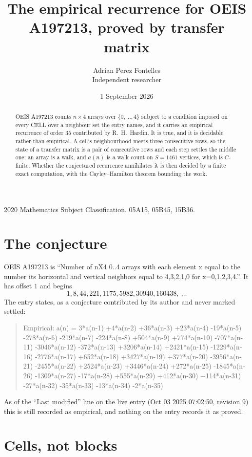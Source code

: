 \documentclass[11pt,a4paper]{article}
\title{The empirical recurrence for OEIS A197213, proved by transfer matrix}
\author{Adrian Perez Fontelles\\ \small Independent researcher}
\date{1 September 2026}
\theoremstyle{plain}
\theoremstyle{definition}
\begin{document}
\maketitle

\begin{abstract}
OEIS A197213 counts $n\times4$ arrays over $\{0,\dots,4\}$ subject to a condition imposed on
every CELL over a neighbour set the entry names, and it carries an empirical recurrence of
order $35$ contributed by R.~H.~Hardin. It is true, and it is decidable rather than
empirical. A cell's neighbourhood meets three consecutive rows, so the state of a transfer
matrix is a pair of consecutive rows and each step settles the middle one; an array is a
walk, and $a(n)$ is a walk count on $S=1461$ vertices, which is $C$-finite. Whether the
conjectured recurrence annihilates it is then decided by a finite exact computation, with the
Cayley--Hamilton theorem bounding the work.
\end{abstract}

\noindent\small 2020 Mathematics Subject Classification. 05A15, 05B45, 15B36.\normalsize

\section{The conjecture}

OEIS A197213 is ``Number of nX4 0..4 arrays with each element x equal to the number its horizontal and vertical neighbors equal to 4,3,2,1,0 for x=0,1,2,3,4.''. It has offset $1$ and begins
\[
1, 8, 44, 221, 1175, 5982, 30940, 160438,\ \dots
\]
The entry states, as a conjecture contributed by its author and never marked settled:
\begin{quote}
Empirical: a(n) = 3*a(n-1) +4*a(n-2) +36*a(n-3) +23*a(n-4) -19*a(n-5) -278*a(n-6) -219*a(n-7) -224*a(n-8) +504*a(n-9) +774*a(n-10) -707*a(n-11) -3046*a(n-12) -372*a(n-13) +3206*a(n-14) +2421*a(n-15) -1229*a(n-16) -2776*a(n-17) +652*a(n-18) +3427*a(n-19) +377*a(n-20) -3956*a(n-21) -2455*a(n-22) +2524*a(n-23) +3446*a(n-24) +272*a(n-25) -1845*a(n-26) -1309*a(n-27) -17*a(n-28) +555*a(n-29) +412*a(n-30) +114*a(n-31) -27*a(n-32) -35*a(n-33) -13*a(n-34) -2*a(n-35)
\end{quote}
As of the ``Last modified'' line on the live entry (Oct 03 2025 07:02:50, revision 9) this is still
recorded as empirical, and nothing on the entry records it as proved.

\section{Cells, not blocks}
\end{document}
